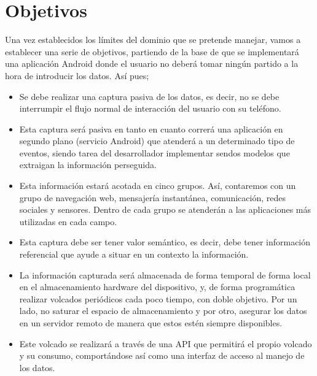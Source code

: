 \documentclass[12pt,a4paper,oneside]{book} %
\begin{document}
\chapter{Objetivos}
Una vez establecidos los límites del dominio que se pretende manejar, vamos a establecer una serie de objetivos, partiendo de la base de que se implementará una aplicación Android donde el usuario no deberá tomar ningún partido a la hora de introducir los datos. Así pues; 
\begin{itemize}
\item Se debe realizar una captura pasiva de los datos, es decir, no se debe interrumpir el flujo normal de interacción del usuario con su teléfono. 
\item Esta captura será pasiva en tanto en cuanto correrá una aplicación en segundo plano (servicio Android) que atenderá a un determinado tipo de eventos, siendo tarea del desarrollador implementar sendos modelos que extraigan la información perseguida. 
\item Esta información estará acotada en cinco grupos. Así, contaremos con un grupo de navegación web, mensajería instantánea, comunicación, redes sociales y sensores. Dentro de cada grupo se atenderán a las aplicaciones más utilizadas en cada campo. 
\item Esta captura debe ser tener valor semántico, es decir, debe tener información referencial que ayude a situar en un contexto la información. 
\item La información capturada será almacenada de forma temporal de forma local en el almacenamiento hardware del dispositivo, y, de forma programática realizar volcados periódicos cada poco tiempo, con doble objetivo. Por un lado, no saturar el espacio de almacenamiento y por otro, asegurar los datos en un servidor remoto de manera que estos estén siempre disponibles. 
\item Este volcado se realizará a través de una API que permitirá el propio volcado y su consumo, comportándose así como una interfaz de acceso al manejo de los datos. 
\end{itemize}
\end{document}
